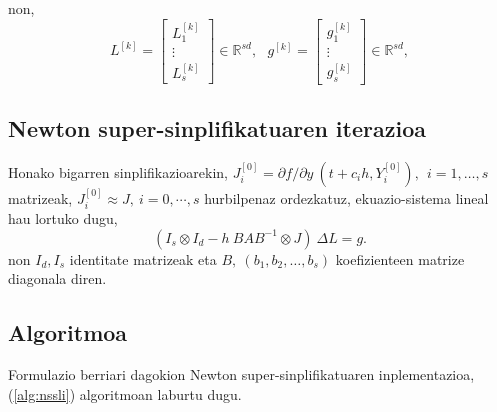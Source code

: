 non,
\begin{equation*}
L^{[k]}=\begin{bmatrix}
L_1^{[k]} \\
\vdots \\
L_s^{[k]}
\end{bmatrix} \in \mathbb{R}^{sd}, \ \ \
g^{[k]}=\begin{bmatrix}
g_1^{[k]} \\
\vdots \\
g_s^{[k]}
\end{bmatrix} \in \mathbb{R}^{sd},  
\end{equation*}


\subsection*{Newton super-sinplifikatuaren iterazioa}

Honako bigarren sinplifikazioarekin, $J_i^{[0]}=\partial f / \partial y \ (t+c_ih, Y_i^{[0]}), \ \  i=1,\dots,s$ matrizeak,  $J_i^{[0]} \approx J, \ i=0,\cdots,s$ hurbilpenaz ordezkatuz, ekuazio-sistema lineal hau lortuko dugu,
\begin{equation}
\label{eq:nsseq2}
(I_s \otimes I_d - h \ BAB^{-1} \otimes J) \ \Delta L = g. 
\end{equation}
non $I_d, I_s$ identitate matrizeak eta $B, \ (b_1,b_2,\dots,b_s)$ koefizienteen matrize diagonala diren.  

\subsection*{Algoritmoa}

Formulazio berriari dagokion Newton super-sinplifikatuaren inplementazioa, (\ref{alg:nssli}) algoritmoan laburtu dugu.

